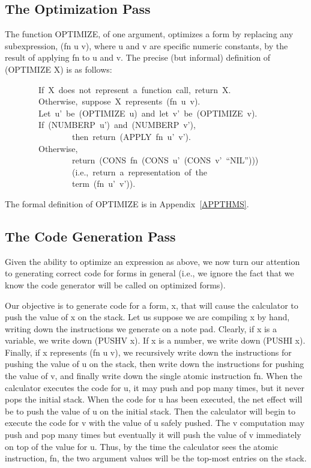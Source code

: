 \documentclass[11pt]{book}
\newenvironment{pubasis}{\begin{flushleft}\ttfamily\small}{\normalsize\rmfamily\end{flushleft}}
\newcommand{\pubdefaulttextsize}{\large}
\begin{document}
\subsection{The Optimization Pass}
\pubdefaulttextsize
The function OPTIMIZE, of one argument, optimizes a form
by replacing any subexpression, (fn u v), where u and
v are specific numeric constants, by the result of
applying fn to u and v.  The precise  (but informal) definition of
(OPTIMIZE X) is as follows:
\begin{pubasis}
~~~~~~~~If~X~does~not~represent~a~function~call,~return~X.\\

~~~~~~~~Otherwise,~suppose~X~represents~(fn~u~v).\\
~~~~~~~~Let~u'~be~(OPTIMIZE~u)~and~let~v'~be~(OPTIMIZE~v).\\
~~~~~~~~If~(NUMBERP~u')~and~(NUMBERP~v'),\\
~~~~~~~~~~~~~~~~then~return~(APPLY~fn~u'~v').\\
~~~~~~~~Otherwise,\\
~~~~~~~~~~~~~~~~return~(CONS~fn~(CONS~u'~(CONS~v'~``NIL'')))\\
~~~~~~~~~~~~~~~~(i.e.,~return~a~representation~of~the\\
~~~~~~~~~~~~~~~~term~(fn~u'~v')).\\
\end{pubasis}
The formal definition of OPTIMIZE is in Appendix~\ref{APPTHMS}.
\subsection{The Code Generation Pass}
\pubdefaulttextsize
Given the ability to optimize an expression as above, we 
now turn our attention to generating correct code for
forms in general (i.e., we  ignore the fact that we
know the code generator will be called on optimized forms).

Our objective is to generate code for a form, x, that will cause
the calculator to push the value of x on the stack.
Let us suppose we are compiling x by hand, writing down
the instructions we generate on a note pad.
Clearly, if x is a variable, we    write down (PUSHV x).
If x is a number, we write down (PUSHI x).  Finally,
if x represents (fn u v), we recursively write down the
instructions for pushing the value of u on the stack, then write down
the instructions for pushing the value of v, and finally write down
the single atomic instruction fn.
When the calculator executes the code for u, it may push and
pop many times,
but it never pops the initial stack.
When the code for u has been executed, the net effect will be to push
the value of u on  the initial stack.  Then the calculator will
begin to execute the code for v with the value of u safely pushed.
The v computation
may push and pop many times but eventually it will push the
value of v immediately on top of the value for u.
Thus, by the time the calculator sees the atomic instruction, fn,
the two argument values will be the top-most entries on the stack.
\end{document}
